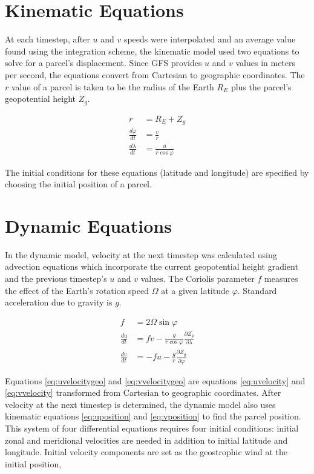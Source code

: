 \section{Kinematic Equations}
At each timestep, after $u$ and $v$ speeds were interpolated and an average value found using the integration scheme, the kinematic model used two equations to solve for a parcel's displacement. 
Since GFS provides $u$ and $v$ values in meters per second, the equations convert from Cartesian to geographic coordinates. 
The $r$ value of a parcel is taken to be the radius of the Earth $R_E$ plus the parcel's geopotential height $Z_g$.

\begin{align}
    r &= R_E + Z_g \\[2ex]
    \frac{d \varphi}{dt} &= \frac{v}{r} \label{eq:uposition} \\
    \frac{d \lambda}{dt} &= \frac{u}{r \cos{\varphi}} \label{eq:vposition}
\end{align}

The initial conditions for these equations (latitude and longitude) are specified by choosing the initial position of a parcel.

\section{Dynamic Equations}
In the dynamic model, velocity at the next timestep was calculated using advection equations which incorporate the current geopotential height gradient and the previous timestep's $u$ and $v$ values.
The Coriolis parameter $f$ measures the effect of the Earth's rotation speed $\Omega$ at a given latitude $\varphi$.
Standard acceleration due to gravity is $g$. 

\begin{align}
    f &= 2 \Omega \sin{\varphi} \\[2ex]
    \frac{du}{dt} &= fv - \frac{g}{r \cos{\varphi}} \frac{\partial Z_g}{\partial \lambda} \label{eq:uvelocitygeo}\\
    \frac{dv}{dt} &= -fu -\frac{g}{r} \frac{\partial Z_g}{\partial \varphi} \label{eq:vvelocitygeo}
\end{align}

Equations \ref{eq:uvelocitygeo} and \ref{eq:vvelocitygeo} are equations \ref{eq:uvelocity} and \ref{eq:vvelocity} transformed from Cartesian to geographic coordinates. 
After velocity at the next timestep is determined, the dynamic model also uses kinematic equations \ref{eq:uposition} and \ref{eq:vposition} to find the parcel position.
This system of four differential equations requires four initial conditions: initial zonal and meridional velocities are needed in addition to initial latitude and longitude.
Initial velocity components are set as the geostrophic wind at the initial position,

